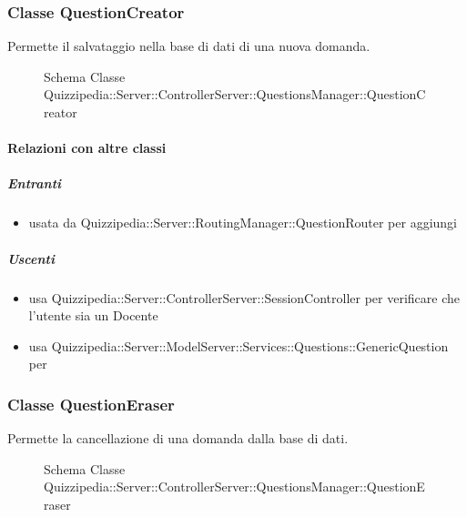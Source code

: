 \subsubsection{Classe QuestionCreator}
Permette il salvataggio nella base di dati di una nuova domanda.
\begin{figure}[H]
\centering
\noindent{}
\caption[Schema Classe QuestionCreator]{Schema Classe Quizzipedia::Server::ControllerServer::QuestionsManager::QuestionCreator}
\end{figure}
\paragraph{Relazioni con altre classi}
\subparagraph{Entranti}
\begin{itemize}
\item usata da Quizzipedia::Server::RoutingManager::QuestionRouter per aggiungi
\end{itemize}
\subparagraph{Uscenti}
\begin{itemize}
\item usa Quizzipedia::Server::ControllerServer::SessionController per verificare che l'utente sia un Docente
\item usa Quizzipedia::Server::ModelServer::Services::Questions::GenericQuestion per 
\end{itemize}
\subsubsection{Classe QuestionEraser}
Permette la cancellazione di una domanda dalla base di dati.
\begin{figure}[H]
\centering
\noindent{}
\caption[Schema Classe QuestionEraser]{Schema Classe Quizzipedia::Server::ControllerServer::QuestionsManager::QuestionEraser}
\end{figure}
